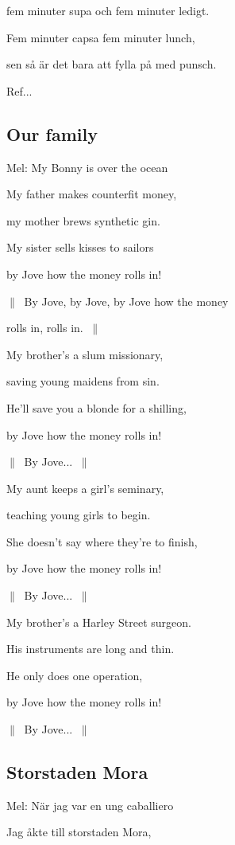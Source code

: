 fem minuter supa och fem minuter ledigt.


Fem minuter capsa fem minuter lunch,


sen så är det bara att fylla på med punsch.\bigskip


Ref... \bigskip


\subsection{\textbf{Our family}}

Mel: My Bonny is over the ocean\bigskip



My father makes counterfit money,


my mother brews synthetic gin.


My sister sells kisses to sailors


by Jove how the money rolls in!


$\|\:$ By Jove, by Jove, by Jove how the money


rolls in, rolls in. $\:\|$\bigskip


My brother’s a slum missionary,


saving young maidens from sin.


He’ll save you a blonde for a shilling,


by Jove how the money rolls in!


$\|\:$ By Jove... $\:\|$\bigskip


My aunt keeps a girl’s seminary,


teaching young girls to begin.


She doesn’t say where they’re to finish,


by Jove how the money rolls in!


$\|\:$ By Jove... $\:\|$\bigskip


My brother’s a Harley Street surgeon.


His instruments are long and thin.


He only does one operation,


by Jove how the money rolls in!


$\|\:$ By Jove... $\:\|$\bigskip


\subsection{\textbf{Storstaden Mora}}

Mel: När jag var en ung caballiero\bigskip

Jag åkte till storstaden Mora,

